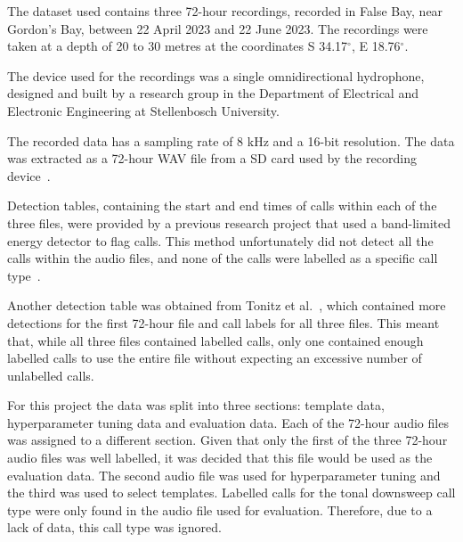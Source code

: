 \label{chap:dataset}

\label{sec:background}

The dataset used contains three 72-hour recordings, recorded in False Bay, near Gordon's Bay, between 22 April 2023 and 22 June 2023.
The recordings were taken at a depth of 20 to 30 metres at the coordinates S 34.17$^\circ$, E 18.76$^\circ$.

The device used for the recordings was a single omnidirectional hydrophone, designed and built by a research group in the
Department of Electrical and Electronic Engineering at Stellenbosch University.

The recorded data has a sampling rate of 8 kHz and a 16-bit resolution. The data was extracted as a 72-hour \ac{WAV} file from a \ac{SD} card
used by the recording device~\cite{data_set}.

\label{sec:labeling}

Detection tables, containing the start and end times of calls within each of the three files, were provided by a previous research
project that used a band-limited energy detector to flag calls. This method unfortunately did not detect all the calls within the
audio files, and none of the calls were labelled as a specific call type~\cite{data_set}.

Another detection table was obtained from Tonitz et al.~\cite{gunther_calls}, which contained more detections for the first 72-hour file and call labels for
all three files.
This meant that, while all three files contained labelled calls, only one contained enough labelled calls to use the entire file
without expecting an excessive number of unlabelled calls.

\label{sec:data-splitting}

For this project the data was split into three sections: template data, hyperparameter tuning data and evaluation data. Each of the
72-hour audio files was assigned to a different section. Given that only
the first of the three 72-hour audio files was well labelled, it was decided that this file would be used as the evaluation data.
The second audio file was used for hyperparameter tuning and the third was used to select templates. Labelled calls for the
tonal downsweep call type were only found in the audio file used for evaluation. Therefore, due to a lack of data, this call type was ignored.

